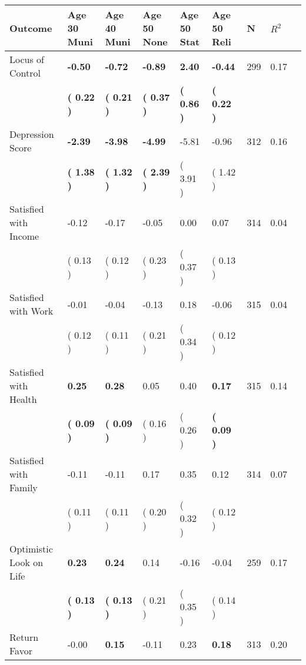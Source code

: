 \begin{tabular}{L{6.2cm} C{1.8cm} C{1.8cm} C{1.8cm} C{1.8cm} C{1.8cm} C{1.8cm} C{0.3cm} C{0.3cm}}
\toprule
 \textbf{Outcome} & \textbf{Age 30 Muni} & \textbf{Age 40 Muni} & \textbf{Age 50 None} & \textbf{Age 50 Stat} & \textbf{Age 50 Reli} & \textbf{N} & \textbf{$ R^2$} \\
\midrule
Locus of Control & \textbf{    -0.50} & \textbf{    -0.72} & \textbf{    -0.89} & \textbf{     2.40} & \textbf{    -0.44}  & 299 &       0.17 \\ 
 & \textbf{(     0.22 )} & \textbf{(     0.21 )} & \textbf{(     0.37 )} & \textbf{(     0.86 )} & \textbf{(     0.22 )}  & \\
Depression Score & \textbf{    -2.39} & \textbf{    -3.98} & \textbf{    -4.99} &     -5.81 &     -0.96  & 312 &       0.16 \\ 
 & \textbf{(     1.38 )} & \textbf{(     1.32 )} & \textbf{(     2.39 )} & (     3.91 ) & (     1.42 )  & \\
Satisfied with Income &     -0.12 &     -0.17 &     -0.05 &      0.00 &      0.07  & 314 &       0.04 \\ 
 & (     0.13 ) & (     0.12 ) & (     0.23 ) & (     0.37 ) & (     0.13 )  & \\
Satisfied with Work &     -0.01 &     -0.04 &     -0.13 &      0.18 &     -0.06  & 315 &       0.04 \\ 
 & (     0.12 ) & (     0.11 ) & (     0.21 ) & (     0.34 ) & (     0.12 )  & \\
Satisfied with Health & \textbf{     0.25} & \textbf{     0.28} &      0.05 &      0.40 & \textbf{     0.17}  & 315 &       0.14 \\ 
 & \textbf{(     0.09 )} & \textbf{(     0.09 )} & (     0.16 ) & (     0.26 ) & \textbf{(     0.09 )}  & \\
Satisfied with Family &     -0.11 &     -0.11 &      0.17 &      0.35 &      0.12  & 314 &       0.07 \\ 
 & (     0.11 ) & (     0.11 ) & (     0.20 ) & (     0.32 ) & (     0.12 )  & \\
Optimistic Look on Life & \textbf{     0.23} & \textbf{     0.24} &      0.14 &     -0.16 &     -0.04  & 259 &       0.17 \\ 
 & \textbf{(     0.13 )} & \textbf{(     0.13 )} & (     0.21 ) & (     0.35 ) & (     0.14 )  & \\
Return Favor &     -0.00 & \textbf{     0.15} &     -0.11 &      0.23 & \textbf{     0.18}  & 313 &       0.20 \\ 

\end{tabular}
